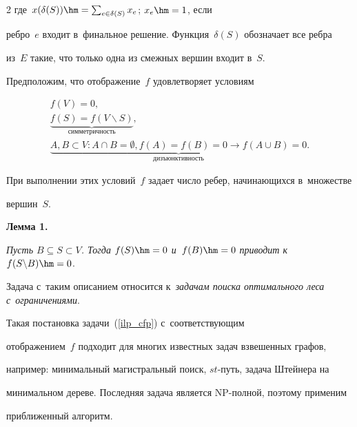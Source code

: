 \begin{multicols}{2}
где~$x(\delta(S))\hm=\sum\nolimits_{e\in \delta(S)}x_e$; $x_e\hm=1$, если 

ребро~$e$ входит в~финальное решение. Функция~$\delta(S)$ обозначает все ребра 

из~$E$ такие, что только одна из смежных вершин входит в~$S$.



Предположим, что отображение~$f$ удовлетворяет условиям

\begin{gather*}

f(V) = 0,\\

 \underbrace{f(S)=f(V\backslash S)}_{\mathrm{симметричность}},\\

\underbrace{A,B\!\subset\! V\!: A\!\cap\! B\! =\! \emptyset, f(A)\!=\!f(B)\!=\!0\!\to\! f(A\!\cup\! B)\! =\! 0}_{\mathrm{дизъюнктивность}}.

\end{gather*}

При выполнении этих условий~$f$ задает число ребер, начинающихся в~множестве 

вершин~$S$.



\smallskip



\noindent

\textbf{Лемма 1.}

\textit{Пусть $B\subseteq S\subset V$. Тогда $f(S) \hm= 0$ и~$f(B) \hm= 0$ приводит к}~$f(S\backslash B) \hm= 0$.



\smallskip



Задача с~таким описанием относится к~\textit{задачам поиска оптимального леса с~ограничениями}. 

Такая постановка задачи~(\ref{ilp_cfp}) с~соответствующим 

отображением~$f$ подходит для многих известных задач взвешенных графов, 

например: минимальный магистральный поиск, $st$-путь, задача Штейнера на 

минимальном дереве. Последняя задача является NP-полной, поэтому применим 

приближенный алгоритм.



\smallskip



\noindent


\end{multicols}
